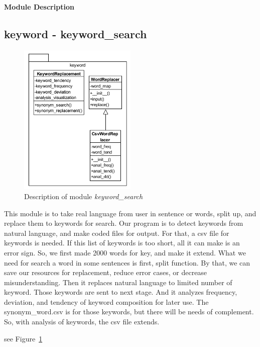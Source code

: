\documentclass[conference]{IEEEtran}
\begin{document}
\textbf{Module Description}

\subsection{keyword - keyword\_search} %
\label{sub:keyword_search}
\begin{figure}[ht]
\centering
\includegraphics[width=0.5\textwidth]{./figures/keyword_search.png}
\caption{Description of module \textit{keyword\_search}}
\label{keyword_search}
\end{figure}


This module is to take real language from user in sentence or words, split up, and replace them to keywords for search. Our program is to detect keywords from natural language, and make coded files for output. For that, a csv file for keywords is needed. If this list of keywords is too short, all it can make is an error sign. So, we first made 2000 words for key, and make it extend. What we need for search a word in some sentences is first, split function. By that, we can save our resources for replacement, reduce error cases, or decrease misunderstanding. Then it replaces natural language to limited number of keyword. Those keywords are sent to next stage. And it analyzes frequency, deviation, and tendency of keyword composition for later use. The synonym\_word.csv is for those keywords, but there will be needs of complement. So, with analysis of keywords, the csv file extends. 


see Figure~\ref{keyword_search}
\end{document}
